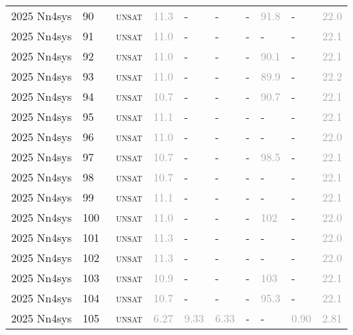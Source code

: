 \begin{center}
{\begin{longtable}{@{}llllllllll@{}}
2025 Nn4sys & 90 & ~\textsc{unsat} & \textcolor{darkgray}{11.3} & - & - & - & \textcolor{darkgray}{91.8} & - & \textcolor{darkgray}{22.0} \\
2025 Nn4sys & 91 & ~\textsc{unsat} & \textcolor{darkgray}{11.0} & - & - & - & - & - & \textcolor{darkgray}{22.1} \\
2025 Nn4sys & 92 & ~\textsc{unsat} & \textcolor{darkgray}{11.0} & - & - & - & \textcolor{darkgray}{90.1} & - & \textcolor{darkgray}{22.1} \\
2025 Nn4sys & 93 & ~\textsc{unsat} & \textcolor{darkgray}{11.0} & - & - & - & \textcolor{darkgray}{89.9} & - & \textcolor{darkgray}{22.2} \\
2025 Nn4sys & 94 & ~\textsc{unsat} & \textcolor{darkgray}{10.7} & - & - & - & \textcolor{darkgray}{90.7} & - & \textcolor{darkgray}{22.1} \\
2025 Nn4sys & 95 & ~\textsc{unsat} & \textcolor{darkgray}{11.1} & - & - & - & - & - & \textcolor{darkgray}{22.1} \\
2025 Nn4sys & 96 & ~\textsc{unsat} & \textcolor{darkgray}{11.0} & - & - & - & - & - & \textcolor{darkgray}{22.0} \\
2025 Nn4sys & 97 & ~\textsc{unsat} & \textcolor{darkgray}{10.7} & - & - & - & \textcolor{darkgray}{98.5} & - & \textcolor{darkgray}{22.1} \\
2025 Nn4sys & 98 & ~\textsc{unsat} & \textcolor{darkgray}{10.7} & - & - & - & - & - & \textcolor{darkgray}{22.1} \\
2025 Nn4sys & 99 & ~\textsc{unsat} & \textcolor{darkgray}{11.1} & - & - & - & - & - & \textcolor{darkgray}{22.1} \\
2025 Nn4sys & 100 & ~\textsc{unsat} & \textcolor{darkgray}{11.0} & - & - & - & \textcolor{darkgray}{102} & - & \textcolor{darkgray}{22.0} \\
2025 Nn4sys & 101 & ~\textsc{unsat} & \textcolor{darkgray}{11.3} & - & - & - & - & - & \textcolor{darkgray}{22.0} \\
2025 Nn4sys & 102 & ~\textsc{unsat} & \textcolor{darkgray}{11.3} & - & - & - & - & - & \textcolor{darkgray}{22.0} \\
2025 Nn4sys & 103 & ~\textsc{unsat} & \textcolor{darkgray}{10.9} & - & - & - & \textcolor{darkgray}{103} & - & \textcolor{darkgray}{22.1} \\
2025 Nn4sys & 104 & ~\textsc{unsat} & \textcolor{darkgray}{10.7} & - & - & - & \textcolor{darkgray}{95.3} & - & \textcolor{darkgray}{22.1} \\
2025 Nn4sys & 105 & ~\textsc{unsat} & \textcolor{darkgray}{6.27} & \textcolor{darkgray}{9.33} & \textcolor{darkgray}{6.33} & - & - & \textcolor{darkgray}{0.90} & \textcolor{darkgray}{2.81} \\

\end{longtable}}
\end{center}
